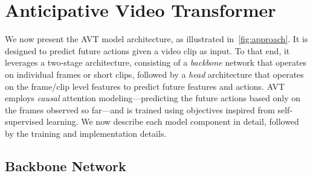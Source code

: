 \documentclass[10pt,twocolumn,letterpaper]{article}
\newcommand{\methodfull}{Anticipative Video Transformer\xspace}
\newcommand{\method}{AVT\xspace}
\begin{document}
\begin{figure*}[t]
    \centering
{} \hfill
    \caption{
        {\em (Left)} {\bf \method architecture.} We split the  input frames into non-overlapping patches that are linearly projected. We add a learned \texttt{[CLASS]} token, along with spatial position embeddings, and the resulting features are passed through multiple layers of multi-head attention, with shared weights across the transformers applied to all frames. We take the resulting features corresponding to the \texttt{[CLASS]} token, append a temporal position encoding  and pass it through the Causal Transformer Decoder that predicts the future feature at frame , after attending to all features from . The resulting feature is trained to regress to the true future feature () and predict the action at that time point if labeled (), and the last prediction is trained to predict the future action (). {\em (Right)} {\bf Causal Transformer Decoder.} It follows the Transformer architecture with pre-norm~\cite{wang2019learning}, causal masking in attention, and a final LayerNorm~\cite{radford2019language}. 
}
\label{fig:approach}
\end{figure*}
 
\section{\methodfull{}}

We now present the \method model architecture, as illustrated in~\cref{fig:approach}. It is designed to predict future actions given a video clip as input. To that end, it leverages a two-stage architecture, consisting of a {\em backbone} network that operates on individual frames or short clips, followed by a {\em head} architecture that operates on the frame/clip level features to predict future features and actions. \method employs {\em causal} attention modeling---predicting the future actions based only on the frames observed so far---and is trained using objectives inspired from self-supervised learning. We now 
describe
each model component in detail, followed by the training and implementation details.





\subsection{Backbone Network}
\end{document}
